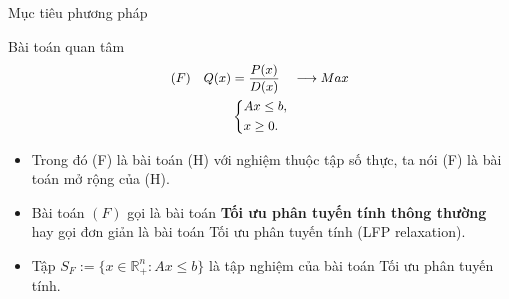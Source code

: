 \documentclass{beamer}
\begin{document}
\begin{frame}
   \center 
   \Huge Mục tiêu phương pháp
\end{frame}

\begin{frame}{Bài toán quan tâm}
\begin{equation} \small \label{F}
    \begin{split}
    (F) \quad Q(x) & = \frac{P(x)}{D(x)} \quad \longrightarrow Max \\
        & \left\{
        \begin{split}
        &Ax \leq  b, \\
        &x \geq 0. \\
        \end{split}
        \right.    
    \end{split}
\end{equation}            
\begin{itemize} \small
\item Trong đó (F) là bài toán (H) với nghiệm thuộc tập số thực, ta nói (F) là bài toán mở rộng của (H).
\item Bài toán $(F)$ gọi là bài toán \textbf{Tối ưu phân tuyến tính thông thường} hay gọi đơn giản là bài toán Tối ưu phân tuyến tính (LFP relaxation).
\item Tập $S_F:=\{x\in \mathbb{R}^n_+: Ax\leq b\}$ là tập nghiệm của bài toán Tối ưu phân tuyến tính. 
\end{itemize}
\end{frame}
\end{document}
